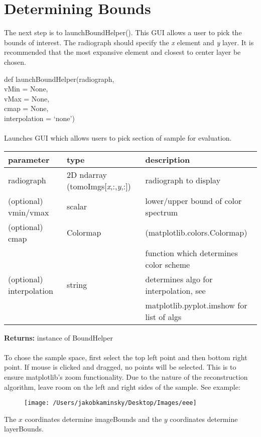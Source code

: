 \documentclass[10pt]{article}
\begin{document}
\section{Determining Bounds}
The next step is to launchBoundHelper(). This GUI allows a user to pick the bounds of interest.
The radiograph should specify the \textit{x} element and \textit{y} layer. It is recommended that
the most expansive element and closest to center layer be chosen.\\
\begin{center}
def launchBoundHelper(radiograph,\\vMin = None,\\ vMax = None,\\ cmap = None,\\ interpolation = `none')\\
\ \\Launches GUI which allows users to pick section of sample for evaluation.
\end{center}
\begin{table}[H]
    \centering
    \begin{tabular}{|l|l|l|}
        \hline
        \textbf{parameter} & \textbf{type} &\textbf{description}  \\ \hline
        radiograph & 2D ndarray (tomoImgs[\textit{x},:,\textit{y},:])& radiograph to display \\ \hline
        (optional) vmin/vmax & scalar & lower/upper bound of color spectrum \\ \hline
        (optional) cmap & Colormap & (matplotlib.colors.Colormap)\\ && function which determines color scheme \\ \hline
        (optional) interpolation & string &  determines algo for interpolation, see\\
         & & matplotlib.pyplot.imshow for list of algs \\ \hline
    \end{tabular}
\end{table}
{\center \textbf{Returns:} instance of BoundHelper\\}
\ \\ To chose the sample space, first select the top left point and then bottom right point. 
If mouse is clicked and dragged, no points will be selected. This is to ensure matplotlib's zoom functionality.
Due to the nature of the reconstruction algorithm, leave room on the left and right sides of the sample. See example:
\begin{figure}[H]
    \begin{center}
        \texttt{[image: /Users/jakobkaminsky/Desktop/Images/eee]}
    \end{center}
\end{figure}
\noindent The $x$ coordinates determine imageBounds and the $y$ coordinates determine layerBounds.
\end{document}
